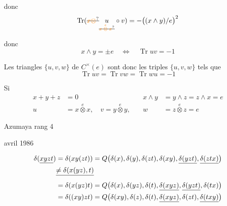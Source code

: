 
donc
\[
 \operatorname{Tr}(\deleted{\unsure{x\otimes}}\underset{\deleted{\unsure{x\overset{e}{\otimes}x}}}{u}\circ v)
 =-\bigl((x\wedge y)/e\bigr)^2
\]


donc
\[
 x\wedge y=\pm e\quad\Longleftrightarrow\quad\boxed{\operatorname{Tr}uv=-1}
\]

Les triangles $\{u,v,w\}$ de $C^\times(e)$ sont donc les triples $\{u,v,w\}$ tels que
\[
 \operatorname{Tr}uv=\operatorname{Tr}vw=\operatorname{Tr}wu=-1
\]

Si 
\[
 \begin{aligned}
 x+y+z&=0 & x\wedge y&=y\wedge z=z\wedge x=e\\
 u&=x\overset{e}{\otimes}x,\quad v=y\overset{e}{\otimes}y,\quad & w&=z\overset{e}{\otimes}z=e
 \end{aligned}
\]

Azumaya rang 4

avril 1986

\[
\begin{aligned}
 \delta(\underline{xyzt})&=\delta(xy(zt))=Q\bigl(\delta(x),\delta(y),\delta(zt),\delta(xy),\underline{\delta(yzt)},\underline{\delta(ztx)}\bigr)\\
 &\deleted{\ne\delta(x(yz),t)}\\
 &=\delta(x(yz)t)=Q\bigl(\delta(x),\delta(yz),\delta(t),\underline{\delta(xyz)},\underline{\delta(yzt)},\delta(tx)\bigr)\\
 &=\delta((xy)zt)=Q\bigl(\delta(xy),\delta(z),\delta(t),\underline{\delta(xyz)},\delta(zt),\underline{\delta(txy)}\bigr)
\end{aligned}
\]



